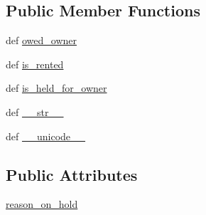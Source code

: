 \subsection*{Public Member Functions}
\begin{DoxyCompactItemize}
\item 
def \hyperlink{classreservation__manager_1_1models_1_1Reservation_a5bc1634aa27fafdeadfaa8e1a98dfff8}{owed\-\_\-owner}
\item 
def \hyperlink{classreservation__manager_1_1models_1_1Reservation_ab63645333f31a740a5efff83f7d47a4a}{is\-\_\-rented}
\item 
def \hyperlink{classreservation__manager_1_1models_1_1Reservation_a82a07e222dfcce6cda1a4c0168ac2ba0}{is\-\_\-held\-\_\-for\-\_\-owner}
\item 
def \hyperlink{classreservation__manager_1_1models_1_1Reservation_a12bea46b97cdcf7999869174c4de52bb}{\-\_\-\-\_\-str\-\_\-\-\_\-}
\item 
def \hyperlink{classreservation__manager_1_1models_1_1Reservation_ab111c48f52c712cadc01338b64c8f15d}{\-\_\-\-\_\-unicode\-\_\-\-\_\-}
\end{DoxyCompactItemize}
\subsection*{Public Attributes}
\begin{DoxyCompactItemize}
\item 
\hyperlink{classreservation__manager_1_1models_1_1Reservation_aae0061bbb5fade388156256d1d3676e3}{reason\-\_\-on\-\_\-hold}
\end{DoxyCompactItemize}
